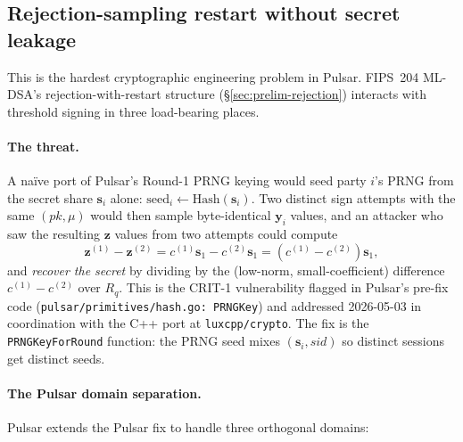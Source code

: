 \documentclass[11pt,a4paper]{article}
\theoremstyle{definition}
\theoremstyle{remark}
\newcommand{\Rq}{R_q}
\begin{document}
\subsection{Rejection-sampling restart without secret leakage}
\label{sec:impl-rejection-restart}

This is the hardest cryptographic engineering problem in Pulsar.
FIPS~204 ML-DSA's rejection-with-restart structure (\S\ref{sec:prelim-rejection})
interacts with threshold signing in three load-bearing places.

\paragraph{The threat.}
A na\"ive port of Pulsar's Round-1 PRNG keying would seed party
$i$'s PRNG from the secret share $\mathbf{s}_i$ alone:
\(
\text{seed}_i \gets \text{Hash}(\mathbf{s}_i)
\).
Two distinct sign attempts with the same $(\mathit{pk}, \mu)$ would
then sample byte-identical $\mathbf{y}_i$ values, and an attacker
who saw the resulting $\mathbf{z}$ values from two attempts could
compute
\[
\mathbf{z}^{(1)} - \mathbf{z}^{(2)} = c^{(1)} \mathbf{s}_1 - c^{(2)} \mathbf{s}_1
= (c^{(1)} - c^{(2)}) \mathbf{s}_1,
\]
and \emph{recover the secret} by dividing by the (low-norm,
small-coefficient) difference $c^{(1)} - c^{(2)}$ over $\Rq$. This is
the CRIT-1 vulnerability flagged in Pulsar's pre-fix code
(\texttt{pulsar/primitives/hash.go: PRNGKey}) and addressed
2026-05-03 in coordination with the C++ port at
\texttt{luxcpp/crypto}. The fix is the
\texttt{PRNGKeyForRound} function: the PRNG seed mixes
$(\mathbf{s}_i, \mathit{sid})$ so distinct sessions get distinct
seeds.

\paragraph{The Pulsar domain separation.}
Pulsar extends the Pulsar fix to handle three orthogonal
domains:
\end{document}
